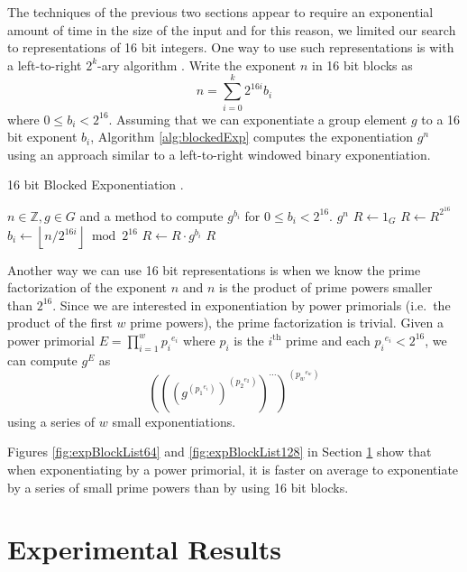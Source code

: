 \documentclass{ucalgthes1}
\theoremstyle{definition}
\newcommand{\ZZ}{\mathbb{Z}}
\newcommand{\floor}[1]{\left\lfloor #1 \right\rfloor}
\newcommand{\ceil}[1]{\left\lceil #1 \right\rceil}
\begin{document}
The techniques of the previous two sections appear to require an exponential amount of time in the size of the input and for this reason, we limited our search to representations of 16 bit integers.  One way to use such representations is with a left-to-right $2^k$-ary algorithm \mbox{\cite[\S 9.1.2]{Cohen2006}}.  Write the exponent $n$ in 16 bit blocks as
\[
	n = \sum_{i=0}^k 2^{16i} b_i
\]
where $0 \le b_i < 2^{16}$.  Assuming that we can exponentiate a group element $g$ to a 16 bit exponent $b_i$, Algorithm \ref{alg:blockedExp} computes the exponentiation $g^n$ using an approach similar to a left-to-right windowed binary exponentiation.

\begin{algorithm}[htb]
\caption{16 bit Blocked Exponentiation \cite[Algorithm 9.7]{Cohen2006}.}
\label{alg:blockedExp}
\begin{algorithmic}[1]
\Require $n \in \ZZ, g \in G$ and a method to compute $g^{b_i}$ for $0 \le b_i < 2^{16}$.
\Ensure $g^n$
\State $R \gets 1_G$
\For {$i$ from $\ceil{\log_{2^{16}} n}$ downto 0}
	\State $R \gets R^{2^{16}}$ 
	\State $b_i \gets \floor{n / 2^{16i}} \bmod {2^{16}}$
	\State $R \gets R \cdot g^{b_i}$ 
\EndFor
\State \Return $R$
\end{algorithmic}
\end{algorithm}

Another way we can use 16 bit representations is when we know the prime factorization of the exponent $n$ and $n$ is the product of prime powers smaller than $2^{16}$.  Since we are interested in exponentiation by power primorials (i.e.\ the product of the first $w$ prime powers), the prime factorization is trivial.  Given a power primorial $E = \prod_{i=1}^w {p_i}^{e_i}$ where $p_i$ is the $i^{\textrm{th}}$ prime and each ${p_i}^{e_i} < 2^{16}$, we can compute $g^E$ as
\[
\left(\left(\left(g^{\left({p_1}^{e_i}\right)}\right)
    ^{\left({p_2}^{e_2}\right)}\right)^{\cdots}\right)^{\left({p_w}^{e_w}\right)}
\]
using a series of $w$ small exponentiations.

Figures \ref{fig:expBlockList64} and \ref{fig:expBlockList128} in Section \ref{sec:expResults} show that when exponentiating by a power primorial, it is faster on average to exponentiate by a series of small prime powers than by using 16 bit blocks.

\section{Experimental Results}
\label{sec:expResults}
\end{document}
